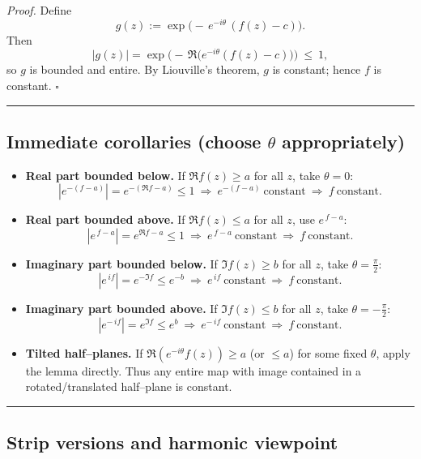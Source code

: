 \documentclass[11pt]{article}
\newcommand{\qed}{\hfill$\square$}
\begin{document}
\medskip

\emph{Proof.}
Define
\[
g(z):=\exp\!\big(-\,e^{-i\theta}\,(f(z)-c)\big).
\]
Then
\[
|g(z)|= \exp\!\Big(-\,\Re\!\big(e^{-i\theta}(f(z)-c)\big)\Big)\ \le\ 1,
\]
so $g$ is bounded and entire. By Liouville’s theorem, $g$ is constant; hence $f$ is constant. \qed

\bigskip\hrule\bigskip

\subsection*{Immediate corollaries (choose $\theta$ appropriately)}

\begin{itemize}
	\item \textbf{Real part bounded below.} If $\Re f(z)\ge a$ for all $z$, take $\theta=0$:
	\[
	|e^{-(f-a)}|=e^{-(\Re f-a)}\le 1 \ \Rightarrow \ e^{-(f-a)}\ \text{constant} \ \Rightarrow\ f\ \text{constant}.
	\]
	
	\item \textbf{Real part bounded above.} If $\Re f(z)\le a$ for all $z$, use $e^{\,f-a}$:
	\[
	|e^{\,f-a}|=e^{\Re f-a}\le 1 \ \Rightarrow \ e^{\,f-a}\ \text{constant} \ \Rightarrow\ f\ \text{constant}.
	\]
	
	\item \textbf{Imaginary part bounded below.} If $\Im f(z)\ge b$ for all $z$, take $\theta=\tfrac{\pi}{2}$:
	\[
	|e^{\,i f}|=e^{-\Im f}\le e^{-b} \ \Rightarrow \ e^{\,i f}\ \text{constant} \ \Rightarrow\ f\ \text{constant}.
	\]
	
	\item \textbf{Imaginary part bounded above.} If $\Im f(z)\le b$ for all $z$, take $\theta=-\tfrac{\pi}{2}$:
	\[
	|e^{-\,i f}|=e^{\Im f}\le e^{b} \ \Rightarrow \ e^{-\,i f}\ \text{constant} \ \Rightarrow\ f\ \text{constant}.
	\]
	
	\item \textbf{Tilted half–planes.} If $\Re(e^{-i\theta} f(z))\ge a$ (or $\le a$) for some fixed $\theta$, apply the lemma directly. Thus any entire map with image contained in a rotated/translated half–plane is constant.
\end{itemize}

\bigskip\hrule\bigskip

\subsection*{Strip versions and harmonic viewpoint}
\end{document}
